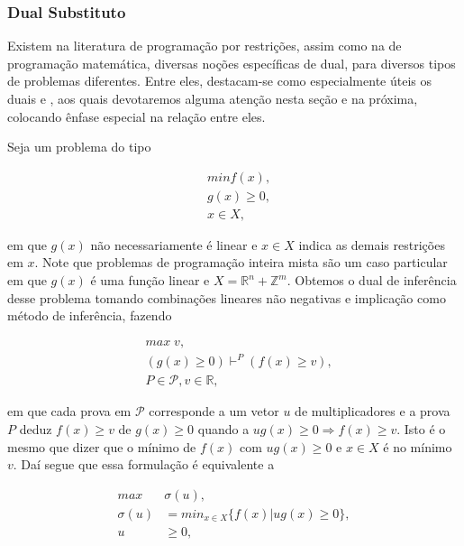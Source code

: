 \subsubsection{Dual Substituto}

Existem na literatura de programação por restrições, assim como na de programação matemática,
diversas noções específicas de dual, para diversos tipos de problemas diferentes. Entre eles, destacam-se
como especialmente úteis os duais  e , aos quais devotaremos alguma atenção
nesta seção e na próxima, colocando ênfase especial na relação entre eles.

Seja um problema do tipo

\begin{equation}
  \begin{split}
    & min f(x),\\
    & g(x) \geq 0,\\
    & x \in X,
  \end{split}\label{eqt:geral}
\end{equation}

\noindent em que $g(x)$ não necessariamente é linear e  $x \in X$ indica as demais restrições em $x$. Note
que problemas de programação inteira mista são um caso particular em que $g(x)$ é uma função linear e $X =
\mathbb{R}^n + \mathbb{Z}^m$. Obtemos o dual de inferência desse problema tomando combinações
lineares não negativas e implicação como método de inferência, fazendo

\begin{equation}
  \begin{split}
    & max \; v,\\
    & (g(x) \geq 0) \vdash^P (f(x) \geq v),\\
    & P \in \mathcal{P}, v \in \mathbb{R},
  \end{split}\label{eqt:surro}
\end{equation}

\noindent em que cada prova em $\mathcal{P}$ corresponde a um vetor $u$ de multiplicadores e a prova
$P$ deduz $f(x) \geq v$ de $g(x) \geq 0$ quando a $ug(x) \geq 0 \Rightarrow f(x) \geq
v$. Isto é o mesmo que dizer que o mínimo de $f(x)$ com $ug(x) \geq 0$ e $x \in X$ é no mínimo $v$.
Daí segue que essa formulação é equivalente a

\begin{align*}
  max \;& \sigma(u),\\
  \sigma(u) &= min_{x\in X}\{f(x)|ug(x)\geq0\},\\
  u &\geq 0,
\end{align*}

